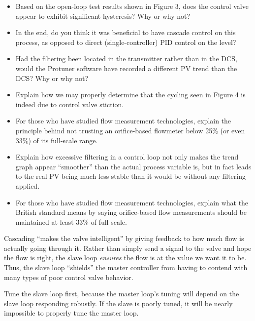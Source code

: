 \begin{itemize}
\item{} Based on the open-loop test results shown in Figure 3, does the control valve appear to exhibit significant hysteresis?  Why or why not?
\item{} In the end, do you think it was beneficial to have cascade control on this process, as opposed to direct (single-controller) PID control on the level?
\item{} Had the filtering been located in the transmitter rather than in the DCS, would the Protuner software have recorded a different PV trend than the DCS?  Why or why not?
\item{} Explain how we may properly determine that the cycling seen in Figure 4 is indeed due to control valve stiction.
\item{} For those who have studied flow measurement technologies, explain the principle behind not trusting an orifice-based flowmeter below 25\% (or even 33\%) of its full-scale range.
\item{} Explain how excessive filtering in a control loop not only makes the trend graph appear ``smoother'' than the actual process variable is, but in fact leads to the real PV being much less stable than it would be without any filtering applied.
\item{} For those who have studied flow measurement technologies, explain what the British standard means by saying orifice-based flow measurements should be maintained at least 33\% of full scale.
\end{itemize}














Cascading ``makes the valve intelligent'' by giving feedback to how much flow is actually going through it.  Rather than simply send a signal to the valve and hope the flow is right, the slave loop {\it ensures} the flow is at the value we want it to be.  Thus, the slave loop ``shields'' the master controller from having to contend with many types of poor control valve behavior.

\vskip 10pt

Tune the slave loop first, because the master loop's tuning will depend on the slave loop responding robustly.  If the slave is poorly tuned, it will be nearly impossible to properly tune the master loop.

